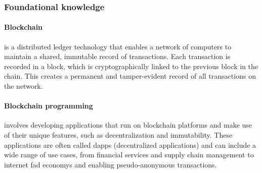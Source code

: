 \documentclass{article}
\theoremstyle{theorem}
\theoremstyle{definition}
\theoremstyle{remark}
\begin{document}
\subsubsection{Foundational knowledge}

    


\paragraph{Blockchain} is a distributed ledger technology that enables a network of computers to maintain a shared, immutable record of transactions. Each transaction is recorded in a block, which is cryptographically linked to the previous block in the chain. This creates a permanent and tamper-evident record of all transactions on the network.

\paragraph{Blockchain programming} involves developing applications that run on blockchain platforms and make use of their unique features, such as decentralization and immutability. These applications are often called dapps (decentralized applications) and can include a wide range of use cases, from financial services and supply chain management to internet fad economys and enabling pseudo-anonymous transactions.
\end{document}
